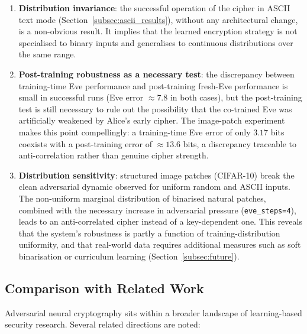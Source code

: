 \documentclass[12pt, a4paper]{article}
\newcommand{\code}[1]{\texttt{\color{CodeRed}#1}}
\begin{document}
\begin{enumerate}[leftmargin=2em, itemsep=6pt]
  \item \textbf{Distribution invariance}: the successful operation of
        the cipher in ASCII text mode (Section~\ref{subsec:ascii_results}),
        without any architectural change, is a non-obvious result.
        It implies that the learned encryption strategy is not
        specialised to binary inputs and generalises to continuous
        distributions over the same range.

  \item \textbf{Post-training robustness as a necessary test}: the
        discrepancy between training-time Eve performance and
        post-training fresh-Eve performance is small in successful runs
        (Eve error $\approx 7.8$ in both cases), but the post-training
        test is still necessary to rule out the possibility that the
        co-trained Eve was artificially weakened by Alice's early cipher.
        The image-patch experiment makes this point compellingly: a
        training-time Eve error of only $3.17$ bits coexists with a
        post-training error of $\approx 13.6$ bits, a discrepancy
        traceable to anti-correlation rather than genuine cipher strength.

  \item \textbf{Distribution sensitivity}: structured image patches
        (CIFAR-10) break the clean adversarial dynamic observed for
        uniform random and ASCII inputs. The non-uniform marginal
        distribution of binarised natural patches, combined with the
        necessary increase in adversarial pressure (\code{eve\_steps=4}),
        leads to an anti-correlated cipher instead of a key-dependent one.
        This reveals that the system's robustness is partly a function of
        training-distribution uniformity, and that real-world data requires
        additional measures such as soft binarisation or curriculum learning
        (Section~\ref{subsec:future}).

\end{enumerate}

\subsection{Comparison with Related Work}
\label{subsec:related_work}

Adversarial neural cryptography sits within a broader landscape of
learning-based security research. Several related directions are noted:
\end{document}
